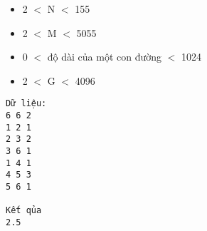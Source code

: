 \begin{itemize}
	\item     2 $<$ N $<$ 155   
	\item     2 $<$ M $<$ 5055   
	\item     0 $<$ độ dài của một con đường $<$ 1024   
	\item     2 $<$ G $<$ 4096   
\end{itemize}
\begin{verbatim}
Dữ liệu:
6 6 2
1 2 1
2 3 2
3 6 1
1 4 1
4 5 3
5 6 1

Kết qủa
2.5
\end{verbatim}